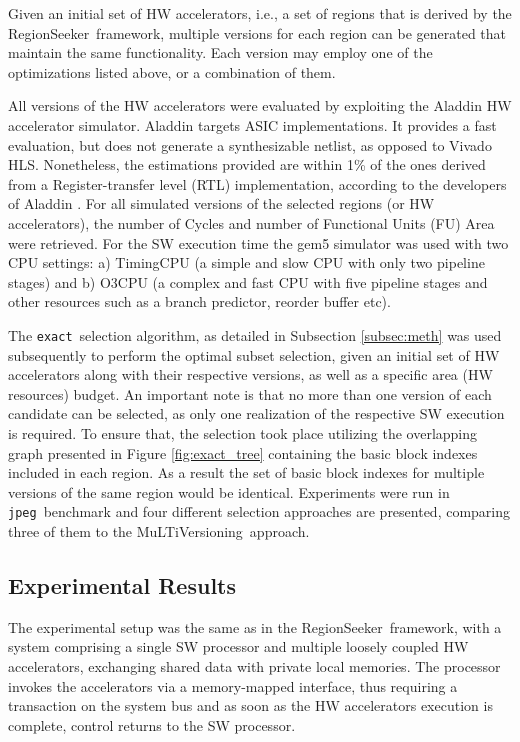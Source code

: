 \documentclass[]{usiinfthesis}
\newcommand{\rseeker}{{RegionSeeker}}
\newcommand{\multi}{MuLTiVersioning}
\newcommand{\plms}{{private local memories}}
\newcommand{\exact}{\texttt{exact}}
\newcommand{\jpeg}{\texttt{jpeg}}
\begin{document}
Given an initial set of HW accelerators, i.e., a set of regions that is derived by the \rseeker\ framework, 
multiple versions for each region can be generated that maintain the same functionality.
Each version may employ one of the optimizations listed above, or a combination of them.
\par


All versions of the HW accelerators were evaluated by exploiting the Aladdin HW accelerator simulator.  
Aladdin targets ASIC implementations. It
provides a fast evaluation, but does not generate a synthesizable netlist,
as opposed to Vivado HLS. Nonetheless, the estimations provided are
within 1\% of the ones derived from a Register-transfer level (RTL) implementation, according to 
the developers of Aladdin \cite{ShaoJul14}.
For all simulated versions of the selected regions (or HW accelerators), the number of Cycles and number 
of Functional Units (FU) Area were retrieved. For the SW execution time the gem5 simulator 
\cite{BinkertFeb11}
was used with two CPU settings: a) TimingCPU  (a simple and slow CPU with only two pipeline stages)
and b) O3CPU (a complex and fast CPU with five pipeline stages and other resources such as a 
branch predictor, reorder buffer etc). \par


The \exact\ selection algorithm, as detailed in Subsection \ref{subsec:meth}  was used subsequently to 
perform the optimal subset selection, 
given an initial set of HW accelerators along with their respective versions, as well as a specific 
area (HW resources) budget. An important note is that no more than one version of each candidate 
can be selected, as only one realization of the respective SW execution is required.
To ensure that, the selection took place utilizing the overlapping graph presented in Figure \ref{fig:exact_tree} 
containing the basic block indexes included in each region. As a result the set of basic block indexes for 
multiple versions of the same region would be identical.
Experiments were run in \jpeg\ benchmark and four different selection
approaches are presented, comparing three of them to the \multi\ approach.\par

\subsection{Experimental Results}
\label{subsec:mv_res}

The experimental setup was the same as in the \rseeker\ framework, with a system comprising a single 
SW processor and multiple loosely coupled HW accelerators, exchanging shared data with \plms.
The processor invokes the accelerators via a memory-mapped
interface, thus requiring a transaction on the system bus and as soon as the HW accelerators execution is complete,
control returns to the SW processor.\par
\end{document}

